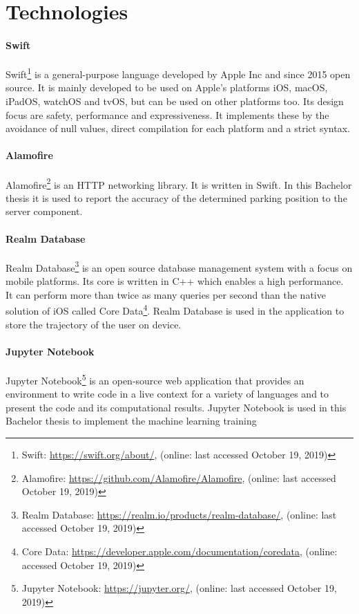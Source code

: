 \section{Technologies}

\paragraph{Swift} Swift\footnote{Swift: \url{https://swift.org/about/}, (online: last accessed October 19, 2019)} is a general-purpose language developed by Apple Inc and since 2015 open source. It is mainly developed to be used on Apple's platforms iOS, macOS, iPadOS, watchOS and tvOS, but can be used on other platforms too. Its design focus are safety, performance and expressiveness. It implements these by the avoidance of null values, direct compilation for each platform and a strict syntax. \cite{apple:swift}

\paragraph{Alamofire} Alamofire\footnote{Alamofire: \url{https://github.com/Alamofire/Alamofire}, (online: last accessed October 19, 2019)} is an HTTP networking library. It is written in Swift. In this Bachelor thesis it is used to report the accuracy of the determined parking position to the server component. \cite{alamofire}

\paragraph{Realm Database} Realm Database\footnote{Realm Database: \url{https://realm.io/products/realm-database/}, (online: last accessed October 19, 2019)} is an open source database management system with a focus on mobile platforms. Its core is written in C++ which enables a high performance. It can perform more than twice as many queries per second than the native solution of iOS called Core Data\footnote{Core Data: \url{https://developer.apple.com/documentation/coredata}, (online: accessed October 19, 2019)}.  Realm Database is used in the application to store the trajectory of the user on device. \cite{realm}

\paragraph{Jupyter Notebook} Jupyter Notebook\footnote{Jupyter Notebook: \url{https://jupyter.org/}, (online: last accessed October 19, 2019)} is an open-source web application that provides an environment to write code in a live context for a variety of languages and to present the code and its computational results. Jupyter Notebook is used in this Bachelor thesis to implement the machine learning training \cite{jupyter}

